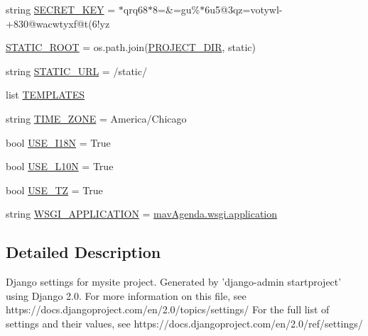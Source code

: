 \begin{DoxyCompactItemize}
\item 
string \mbox{\hyperlink{namespacemavAgenda_1_1settings_a62ddce1502d30dbbeec3818fcaf9eeda}{S\+E\+C\+R\+E\+T\+\_\+\+K\+EY}} = \textquotesingle{}$\ast$qrq68$\ast$8=\&=gu\%$\ast$6u5@3qz=votywl-\/+830@wacwtyxf@t(6!yz\textquotesingle{}
\item 
\mbox{\hyperlink{namespacemavAgenda_1_1settings_a22094b6f2b02c5fe2c669169df0df2c1}{S\+T\+A\+T\+I\+C\+\_\+\+R\+O\+OT}} = os.\+path.\+join(\mbox{\hyperlink{namespacemavAgenda_1_1settings_ab4ce42a5401340f89c8d454623c34d5e}{P\+R\+O\+J\+E\+C\+T\+\_\+\+D\+IR}}, \textquotesingle{}static\textquotesingle{})
\item 
string \mbox{\hyperlink{namespacemavAgenda_1_1settings_ad7fe7173caa4166bb75d132316ea1a88}{S\+T\+A\+T\+I\+C\+\_\+\+U\+RL}} = \textquotesingle{}/static/\textquotesingle{}
\item 
list \mbox{\hyperlink{namespacemavAgenda_1_1settings_a17e29897dc668b9f2955407bd489d8ef}{T\+E\+M\+P\+L\+A\+T\+ES}}
\item 
string \mbox{\hyperlink{namespacemavAgenda_1_1settings_aeec2d025595944833c019a8bd08c85b7}{T\+I\+M\+E\+\_\+\+Z\+O\+NE}} = \textquotesingle{}America/Chicago\textquotesingle{}
\item 
bool \mbox{\hyperlink{namespacemavAgenda_1_1settings_ab54da7bb0c511891167b05e421e69b01}{U\+S\+E\+\_\+\+I18N}} = True
\item 
bool \mbox{\hyperlink{namespacemavAgenda_1_1settings_a6386f16d03828cf70fa9694a6e68514f}{U\+S\+E\+\_\+\+L10N}} = True
\item 
bool \mbox{\hyperlink{namespacemavAgenda_1_1settings_a50a659e1989784a0d7429b153a4054e1}{U\+S\+E\+\_\+\+TZ}} = True
\item 
string \mbox{\hyperlink{namespacemavAgenda_1_1settings_a7ea9722c5dbe55143f70dc7eda97a8d0}{W\+S\+G\+I\+\_\+\+A\+P\+P\+L\+I\+C\+A\+T\+I\+ON}} = \textquotesingle{}\mbox{\hyperlink{namespacemavAgenda_1_1wsgi_aae226973e60e3685aded7ce165fbe8a0}{mav\+Agenda.\+wsgi.\+application}}\textquotesingle{}
\end{DoxyCompactItemize}


\subsection{Detailed Description}
\begin{DoxyVerb}Django settings for mysite project.
Generated by 'django-admin startproject' using Django 2.0.
For more information on this file, see
https://docs.djangoproject.com/en/2.0/topics/settings/
For the full list of settings and their values, see
https://docs.djangoproject.com/en/2.0/ref/settings/
\end{DoxyVerb}
 

